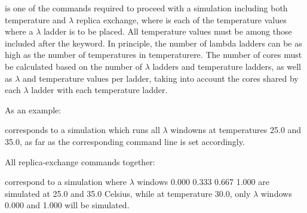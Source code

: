 \documentclass[letterpaper,10pt,english]{sphinxmanual}
\begin{document}
is one of the commands required to proceed with a simulation including both temperature and \(\lambda\) replica exchange, where  is each of the temperature values where a \(\lambda\) ladder is to be placed. All temperature values must be among those included after the  keyword. In principle, the number of lambda ladders can be as high as the number of temperatures in temperaturere. The number of cores must be calculated based on the number of \(\lambda\) ladders and temperature ladders, as well as \(\lambda\) and temperature values per ladder, taking into account the cores shared by each \(\lambda\) ladder with each temperature ladder.

As an example:

%
\begin{sphinxVerbatim}[commandchars=\\\{\}]
   
\end{sphinxVerbatim}

corresponds to a simulation which runs all \(\lambda\) windowns at temperatures 25.0 and 35.0, as far as the corresponding  command line is set accordingly.

All replica-exchange commands together:

%
\begin{sphinxVerbatim}[commandchars=\\\{\}]
     
    
   
   
\end{sphinxVerbatim}

correspond to a simulation where \(\lambda\) windows 0.000 0.333 0.667 1.000 are simulated at 25.0 and 35.0 Celsius, while at temperature 30.0, only \(\lambda\) windows 0.000 and 1.000 will be simulated.


\ignorespaces 
\def\sphinxLiteralBlockLabel{\label{\detokenize{protoms:index-51}}}
%
\begin{sphinxVerbatim}[commandchars=\\\{\}]
 
\end{sphinxVerbatim}
\end{document}

